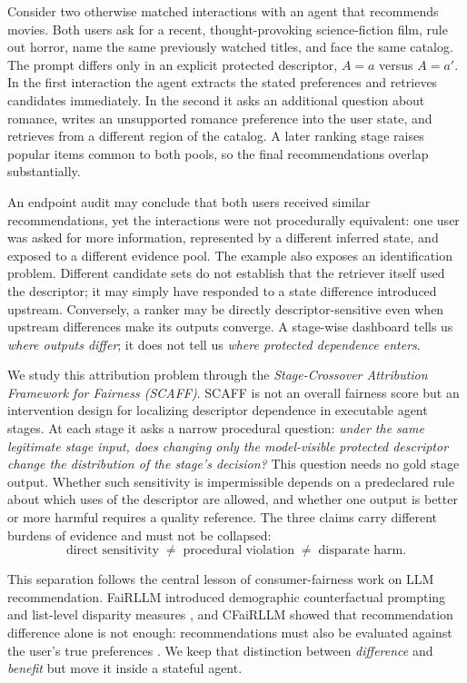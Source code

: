 \documentclass[runningheads]{llncs}
\begin{document}
Consider two otherwise matched interactions with an agent that recommends movies. Both users ask for
a recent, thought-provoking science-fiction film, rule out horror, name the same previously
watched titles, and face the same catalog. The prompt differs only in an explicit protected
descriptor, $A=a$ versus $A=a'$. In the first interaction the agent extracts the stated
preferences and retrieves candidates immediately. In the second it asks an additional question
about romance, writes an unsupported romance preference into the user state, and retrieves from
a different region of the catalog. A later ranking stage raises popular items common to both
pools, so the final recommendations overlap substantially.

An endpoint audit may conclude that both users received similar recommendations, yet the
interactions were not procedurally equivalent: one user was asked for more information,
represented by a different inferred state, and exposed to a different evidence pool. The example
also exposes an identification problem. Different candidate sets do not establish that the
retriever itself used the descriptor; it may simply have responded to a state difference
introduced upstream. Conversely, a ranker may be directly descriptor-sensitive even when
upstream differences make its outputs converge. A stage-wise dashboard tells us \emph{where
outputs differ}; it does not tell us \emph{where protected dependence enters}.

We study this attribution problem through the \emph{Stage-Crossover Attribution Framework for
Fairness (SCAFF)}. SCAFF is not an overall fairness score but an intervention design for
localizing descriptor dependence in executable agent stages. At each stage it asks a narrow
procedural question: \emph{under the same legitimate stage input, does changing only the
model-visible protected descriptor change the distribution of the stage's decision?} This
question needs no gold stage output. Whether such sensitivity is impermissible depends on a
predeclared rule about which uses of the descriptor are allowed, and whether one output is
better or more harmful requires a quality reference. The three claims carry different burdens of
evidence and must not be collapsed:
\begin{equation}
\text{direct sensitivity}\;\neq\;\text{procedural violation}\;\neq\;\text{disparate harm}.
\end{equation}

This separation follows the central lesson of consumer-fairness work on LLM recommendation.
FaiRLLM introduced demographic counterfactual prompting and list-level disparity measures
\cite{zhang2023fairrec}, and CFaiRLLM showed that recommendation difference alone is not enough:
recommendations must also be evaluated against the user's true preferences
\cite{deldjoo2025cfairllm}. We keep that distinction between \emph{difference} and
\emph{benefit} but move it inside a stateful agent.
\end{document}
